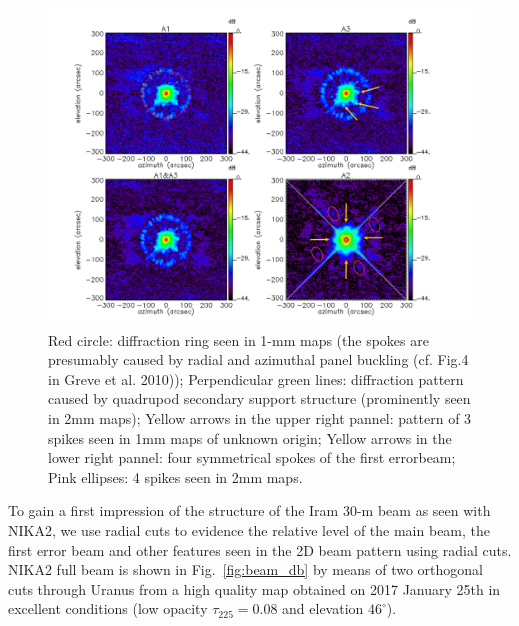 \begin{figure}
\begin{center}
  \includegraphics[clip, angle=0, scale=0.4]{Figures/Beams_features.pdf}
\caption[Noticeable features of NIKA2 beam pattern.]{ Red circle: diffraction ring seen in 1-mm maps (the spokes are presumably caused by radial and azimuthal panel buckling (cf. Fig.4 in Greve et al. 2010)); Perpendicular green lines: diffraction pattern caused by quadrupod secondary support structure (prominently seen in 2mm maps); Yellow arrows in the upper right pannel: pattern of 3 spikes seen in 1mm maps of unknown origin; Yellow arrows in the lower right pannel: four symmetrical spokes of the first errorbeam; Pink ellipses: 4 spikes seen in 2mm maps.}
\label{fig:features}
\end{center}
\end{figure}


To gain a first impression of the structure of the Iram 30-m beam as seen with NIKA2, we use radial cuts to evidence the relative level of the main beam, the first error beam and other features seen in the 2D beam pattern using radial cuts. NIKA2 full beam is shown in Fig.~\ref{fig:beam_db} by means of two orthogonal cuts through Uranus
from a high quality map obtained on 2017 January 25th in excellent conditions
(low opacity $\tau_{225}=0.08$ and elevation $46^{\circ}$).

